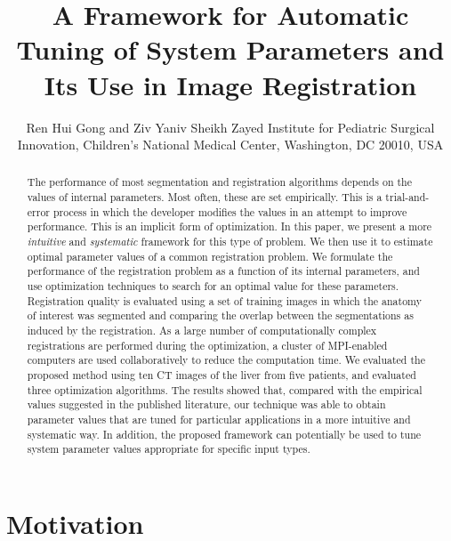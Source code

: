 \documentclass[]{spie}  %
\title{A Framework for Automatic Tuning of System Parameters and Its Use in Image Registration}
\author{Ren Hui Gong\supit{a} and Ziv Yaniv\supit{a}
\skiplinehalf
\supit{a}Sheikh Zayed Institute for Pediatric Surgical Innovation, Children's National Medical Center, Washington, DC 20010, USA
}
\begin{document}
\maketitle

\begin{abstract}
The performance of most segmentation and registration algorithms depends on the values of internal parameters.
Most often, these are set empirically. This is a trial-and-error process in which the developer modifies the values in an attempt to improve performance. This is an implicit form of optimization. In this paper, we present a more \emph{intuitive} and \emph{systematic} framework for this type of problem. We then use it to estimate optimal parameter values of a common registration problem. We formulate the performance of the registration problem as a function of its internal parameters, and use optimization techniques to search for an optimal value for these parameters. Registration quality is evaluated using a set of training images in which the anatomy of interest was segmented and comparing the overlap between the segmentations as induced by the registration. As a large number of computationally complex registrations are performed during the optimization, a cluster of MPI-enabled computers are used collaboratively to reduce the computation time. We evaluated the proposed method using ten CT images of the liver from five patients, and evaluated three optimization algorithms. The results showed that, compared with the empirical values suggested in the published literature, our technique was able to obtain parameter values  that are tuned for particular applications in a more intuitive and systematic way. In addition, the proposed framework can potentially be used to tune system parameter values appropriate for specific input types.
\end{abstract}



\section{Motivation}
\end{document}
